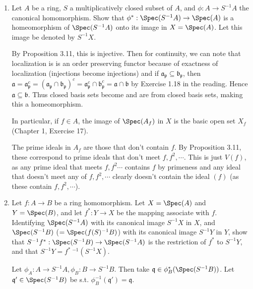 \begin{questions}
\question 
\begin{enumerate}
\item Let $A $ be a ring, $S $ a multiplicatively closed subset of $A $, and $\phi : A \to S^{-1}A $ the canonical homomorphism. Show that $\phi^\ast: \Spec(S^{-1}A) \to \Spec(A) $ is a homeomorphism of $\Spec(S^{-1}A) $ onto its image in $X = \Spec(A) $. Let this image be denoted by $S^{-1}X $.\\
\begin{solution}
	By Proposition 3.11, this is injective.
	Then for continuity, we can note that localization is is an order preserving functor because of exactness of localization (injections become injections) and if $\mathfrak{a}_{\mathfrak{p}} \subseteq \mathfrak{b}_{\mathfrak{p}} $, then $\mathfrak{a} = \mathfrak{a}_{\mathfrak{p}}^c = (\mathfrak{a}_{\mathfrak{p}}\cap \mathfrak{b}_{\mathfrak{p}})^c = \mathfrak{a}_{\mathfrak{p}}^c \cap \mathfrak{b}_{\mathfrak{p}}^c = \mathfrak{a} \cap \mathfrak{b}$ by Exercise 1.18 in the reading.
	Hence $\mathfrak{a} \subseteq \mathfrak{b} $.
	Thus closed basis sets become and are from closed basis sets, making this a homeomorphism.
\end{solution}
In particular, if $f\in A $, the image of $\Spec(A_f) $ in $X $ is the basic open set $X_f $ (Chapter 1, Exercise 17).
\begin{solution}
	The prime ideals in $A_f $ are those that don't contain $f $.
	By Proposition 3.11, these correspond to prime ideals that don't meet $f,f^2,\cdots $.
	This is just $V(f) $, as any prime ideal that meets $f,f^2\cdots $ contains $f $ by primeness and any ideal that doesn't meet any of $f,f^2,\cdots $ clearly doesn't contain the ideal $(f) $ (as these contain $f,f^2,\cdots $).
\end{solution}

\item Let $f:A\to B $ be a ring homomorphism. Let $X = \Spec(A) $ and $Y = \Spec(B) $, and let $f^\ast:Y \to X $ be the mapping associate with $f $. Identifying $\Spec(S^{-1}A) $ with its canonical image $S^{-1}X $ in $X $, and $\Spec(S^{-1}B) $ ($= \Spec(f(S)^{-1}B) $) with its canonical image $S^{-1}Y $ in $Y$, show that $S^{-1}f^\ast: \Spec(S^{-1}B) \to \Spec(S^{-1}A) $ is the restriction of $f^\ast $ to $S^{-1}Y $, and that $S^{-1}Y = f^\ast\ ^{-1}(S^{-1}X)$.
\begin{solution}
	Let $\phi_{A}: A\to S^{-1}A, \phi_{B}: B\to S^{-1}B $.
	Then take $\mathfrak{q} \in \phi_B^\ast(\Spec(S^{-1}B))$.
	Let $\mathfrak{q}'\in \Spec(S^{-1}B)$ be s.t. $\phi_B^{-1}(\mathfrak{q}') = \mathfrak{q}$.


\end{solution}
\end{enumerate}
\end{questions}
